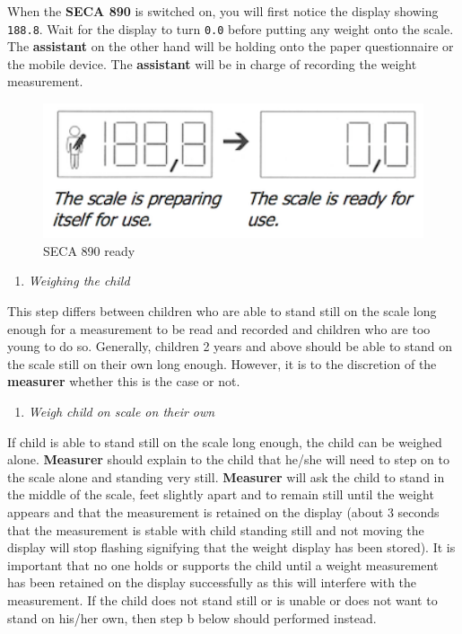 \documentclass[
  12pt,
]{book}
\providecommand{\tightlist}{%
  \setlength{\itemsep}{0pt}\setlength{\parskip}{0pt}}
\begin{document}
When the \textbf{SECA 890} is switched on, you will first notice the display showing \texttt{188.8}. Wait for the display to turn \texttt{0.0} before putting any weight onto the scale. The \textbf{assistant} on the other hand will be holding onto the paper questionnaire or the mobile device. The \textbf{assistant} will be in charge of recording the weight measurement.

\begin{figure}

{\centering \includegraphics[width=4.86in]{images/seca890zero} 

}

\caption{SECA 890 ready}\label{fig:weight8}
\end{figure}

\begin{enumerate}
\def\labelenumi{\arabic{enumi}.}
\setcounter{enumi}{2}
\tightlist
\item
  \emph{Weighing the child}
\end{enumerate}

This step differs between children who are able to stand still on the scale long enough for a measurement to be read and recorded and children who are too young to do so. Generally, children 2 years and above should be able to stand on the scale still on their own long enough. However, it is to the discretion of the \textbf{measurer} whether this is the case or not.

\begin{enumerate}
\def\labelenumi{\alph{enumi}.}
\tightlist
\item
  \emph{Weigh child on scale on their own}
\end{enumerate}

If child is able to stand still on the scale long enough, the child can be weighed alone. \textbf{Measurer} should explain to the child that he/she will need to step on to the scale alone and standing very still. \textbf{Measurer} will ask the child to stand in the middle of the scale, feet slightly apart and to remain still until the weight appears and that the measurement is retained on the display (about 3 seconds that the measurement is stable with child standing still and not moving the display will stop flashing signifying that the weight display has been stored). It is important that no one holds or supports the child until a weight measurement has been retained on the display successfully as this will interfere with the measurement. If the child does not stand still or is unable or does not want to stand on his/her own, then step b below should performed instead.
\end{document}
